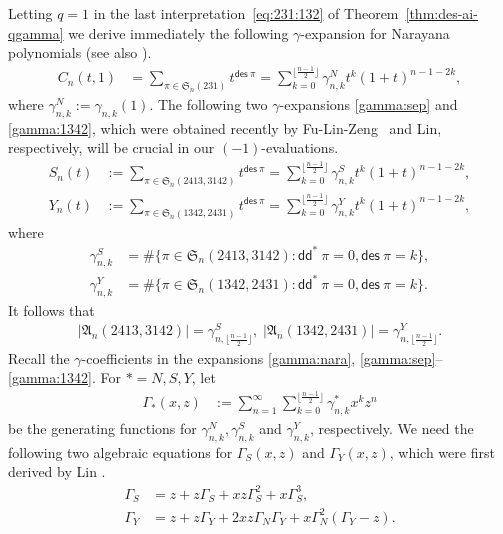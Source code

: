 \documentclass[12pt,reqno]{amsart}
\numberwithin{equation}{section}
\theoremstyle{plain}
\theoremstyle{definition}
\def\S{\mathfrak{S}}
\def\A{\mathfrak{A}}
\def\dd{\mathsf{dd}}
\def\des{\mathsf{des}}
\begin{document}
Letting $q=1$ in the last interpretation~\eqref{eq:231:132}
 of Theorem~\ref{thm:des-ai-qgamma} we derive immediately
the following $\gamma$-expansion for Narayana polynomials (see also \cite[Chapter 4]{Pet}).
\begin{align}
\label{gamma:nara}
C_n(t,1) &=\sum_{\pi\in \S_n(231)} t^{\des\:\pi}
=\sum_{k=0}^{\lfloor\frac{n-1}{2}\rfloor}\gamma_{n,k}^N t^k(1+t)^{n-1-2k},
\end{align}
where $\gamma_{n,k}^N:=\gamma_{n,k}(1)$.
The following two $\gamma$-expansions
 \eqref{gamma:sep} and \eqref{gamma:1342}, which  were  obtained recently by Fu-Lin-Zeng~\cite{FLZ} and  Lin\cite{Lin17}, respectively, will be crucial in our $(-1)$-evaluations.
 \begin{align}
 \label{gamma:sep}
S_n(t) &:=\sum_{\pi\in\S_n(2413,3142)}t^{\des\:\pi} =\sum_{k= 0}^{\lfloor\frac{n-1}{2}\rfloor}\gamma_{n,k}^S t^k (1+t)^{n-1-2k},\\
\label{gamma:1342}
Y_n(t) &:=\sum_{\pi\in\S_n(1342,2431)}t^{\des\:\pi} =\sum_{k= 0}^{\lfloor\frac{n-1}{2}\rfloor}\gamma_{n,k}^Y t^k (1+t)^{n-1-2k},
\end{align}
where
\begin{align}
\label{comb:sep}
\gamma_{n,k}^S &=\#\{\pi \in \S_n(2413, 3142): \dd^*\:\pi=0, \des\:\pi=k\},\\
\label{comb:1342}
\gamma_{n,k}^Y &=\#\{\pi \in \S_n(1342, 2431): \dd^*\:\pi=0, \des\:\pi=k\}.
\end{align}
It follows that
\begin{align}\label{alt-4=gamma}
|\A_n(2413,3142)|=\gamma_{n,\lfloor\frac{n-1}{2}\rfloor}^S,\; |\A_n(1342,2431)|=\gamma_{n,\lfloor\frac{n-1}{2}\rfloor}^Y.
\end{align}
Recall the $\gamma$-coefficients in the expansions \eqref{gamma:nara}, \eqref{gamma:sep}--\eqref{gamma:1342}. For $*=N,S,Y$, let
\begin{align*}
\Gamma_*(x,z)&:=\sum_{n=1}^{\infty}\sum_{k=0}^{\lfloor\frac{n-1}{2}\rfloor}\gamma^*_{n,k}x^kz^n
\end{align*}
be the generating functions for $\gamma^N_{n,k},\gamma^S_{n,k}$ and $\gamma^Y_{n,k}$, respectively. We need the following two algebraic equations for $\Gamma_S(x,z)$ and $\Gamma_Y(x,z)$, which were first derived by Lin \cite{Lin17}.
\begin{align}\label{ae-sep}
\Gamma_S&=z+z\Gamma_S+xz\Gamma^2_S+x\Gamma^3_S,\\
\label{ae-1342}
\Gamma_Y&=z+z\Gamma_Y+2xz\Gamma_N\Gamma_Y+x\Gamma^2_N(\Gamma_Y-z).
\end{align}
\end{document}
